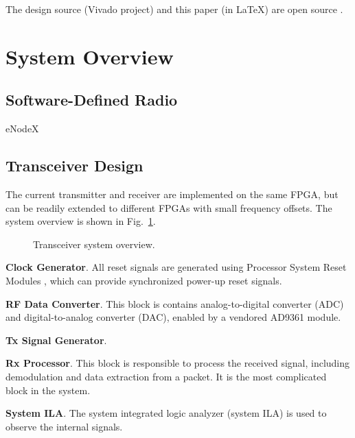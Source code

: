 \documentclass[journal,twoside]{IEEEtran}
\begin{document}
    The design source (Vivado project) and this paper (in \LaTeX) are open source \cite{github_repo}.
    

  \section{System Overview}

    \subsection{Software-Defined Radio}

      eNodeX

    \subsection{Transceiver Design}

      The current transmitter and receiver are implemented on the same FPGA,
      but can be readily extended to different FPGAs with small frequency offsets.
      The system overview is shown in Fig.~\ref{fig:system_overview}.
      \begin{figure}[htbp]
        \centering
        
        \caption{Transceiver system overview.}
        \label{fig:system_overview}
      \end{figure}

      \textbf{Clock Generator}.
      All reset signals are generated using Processor System Reset Modules \cite{xilinx:pg164},
      which can provide synchronized power-up reset signals.

      \textbf{RF Data Converter}.
      This block is contains analog-to-digital converter (ADC) and digital-to-analog converter (DAC),
      enabled by a vendored AD9361 module.

      \textbf{Tx Signal Generator}.

      \textbf{Rx Processor}.
      This block is responsible to process the received signal,
      including demodulation and data extraction from a packet.
      It is the most complicated block in the system.

      \textbf{System ILA}.
      The system integrated logic analyzer (system ILA) \cite{xilinx:pg261} is used to observe the internal signals.
\end{document}

